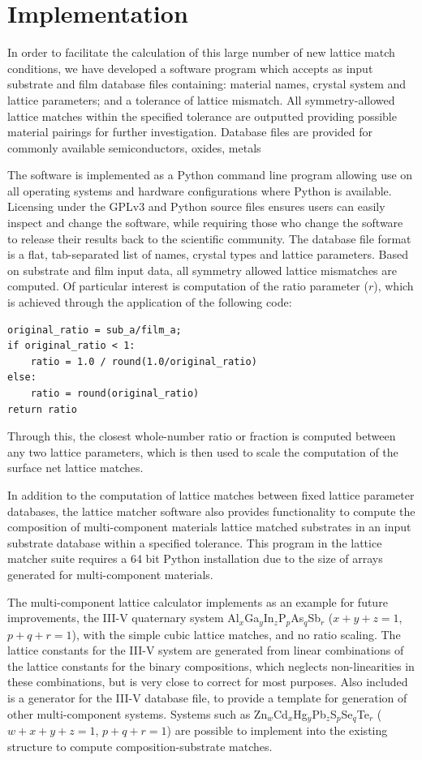 \documentclass[final,5p,times,twocolumn]{elsarticle}
\begin{document}
\section{Implementation}
In order to facilitate the calculation of this large number of new lattice match conditions, we have developed a software program which accepts as input substrate and film database files containing: material names, crystal system and lattice parameters; and a tolerance of lattice mismatch. All symmetry-allowed lattice matches within the specified tolerance are outputted providing possible material pairings for further investigation. Database files are provided for commonly available semiconductors, oxides, metals

The software is implemented as a Python command line program allowing use on all operating systems and hardware configurations where Python is available. Licensing under the GPLv3 and Python source files ensures users can easily inspect and change the software, while requiring those who change the software to release their results back to the scientific community. The database file format is a flat, tab-separated list of names, crystal types and lattice parameters. Based on substrate and film input data, all symmetry allowed lattice mismatches are computed. Of particular interest is computation of the ratio parameter ($r$), which is achieved through the application of the following code:
\begin{verbatim}
original_ratio = sub_a/film_a;
if original_ratio < 1:
    ratio = 1.0 / round(1.0/original_ratio)
else:
    ratio = round(original_ratio)
return ratio
\end{verbatim}
Through this, the closest whole-number ratio or fraction is computed between any two lattice parameters, which is then used to scale the computation of the surface net lattice matches.

In addition to the computation of lattice matches between fixed lattice parameter databases, the lattice matcher software also provides functionality to compute the composition of multi-component materials lattice matched substrates in an input substrate database within a specified tolerance. This program in the lattice matcher suite requires a 64 bit Python installation due to the size of arrays generated for multi-component materials.

The multi-component lattice calculator implements as an example for future improvements, the III-V quaternary system Al$_x$Ga$_y$In$_z$P$_p$As$_q$Sb$_r$ ($x+y+z=1$, $p+q+r=1$), with the simple cubic lattice matches, and no ratio scaling. The lattice constants for the III-V system are generated from linear combinations of the lattice constants for the binary compositions\cite{Ahrenkiel2012}, which neglects non-linearities in these combinations, but is very close to correct for most purposes\cite{Moon1974,Adachi1982}. Also included is a generator for the III-V database file, to provide a template for generation of other multi-component systems. Systems such as Zn$_w$Cd$_x$Hg$_y$Pb$_z$S$_p$Se$_q$Te$_r$ ($w+x+y+z=1$, $p+q+r=1$)  are possible to implement into the existing structure to compute composition-substrate matches.
\end{document}
